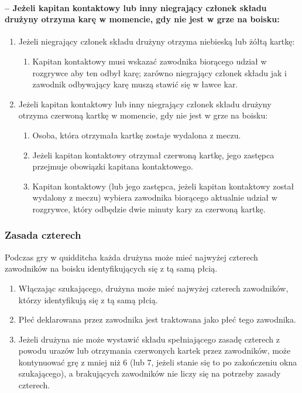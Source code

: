 \documentclass[12pt]{article}
\begin{document}
\paragraph{-- Jeżeli kapitan kontaktowy lub inny niegrający członek
	składu drużyny otrzyma karę w momencie, gdy nie jest w grze na boisku:}

\begin{enumerate}
	\item
	      Jeżeli niegrający członek składu drużyny otrzyma niebieską lub żółtą
	      kartkę:

	      \begin{enumerate}
		      \item
		            Kapitan kontaktowy musi wskazać zawodnika biorącego udział w
		            rozgrywce aby ten odbył karę; zarówno niegrający członek składu jak
		            i zawodnik odbywający karę muszą stawić się w ławce kar.
	      \end{enumerate}
	\item
	      Jeżeli kapitan kontaktowy lub inny niegrający członek składu drużyny
	      otrzyma czerwoną kartkę w momencie, gdy nie jest w grze na boisku:

	      \begin{enumerate}
		      \item
		            Osoba, która otrzymała kartkę zostaje wydalona z meczu.
		      \item
		            Jeżeli kapitan kontaktowy otrzymał czerwoną kartkę, jego zastępca
		            przejmuje obowiązki kapitana kontaktowego.
		      \item
		            Kapitan kontaktowy (lub jego zastępca, jeżeli kapitan kontaktowy
		            został wydalony z meczu) wybiera zawodnika biorącego aktualnie
		            udział w rozgrywce, który odbędzie dwie minuty kary za czerwoną
		            kartkę.
	      \end{enumerate}
\end{enumerate}

\subsubsection{Zasada czterech}

Podczas gry w quidditcha każda drużyna może mieć najwyżej czterech
zawodników na boisku identyfikujących się z tą samą płcią.

\begin{enumerate}
	\item
	      Włączając szukającego, drużyna może mieć najwyżej czterech zawodników,
	      którzy identyfikują się z tą samą płcią.
	\item
	      Płeć deklarowana przez zawodnika jest traktowana jako płeć tego
	      zawodnika.
	\item
	      Jeżeli drużyna nie może wystawić składu spełniającego zasadę czterech
	      z powodu urazów lub otrzymania czerwonych kartek przez zawodników,
	      może kontynuować grę z mniej niż 6 (lub 7, jeżeli stanie się to po
	      zakończeniu okna szukającego), a brakujących zawodników nie liczy się
	      na potrzeby zasady czterech.
\end{enumerate}
\end{document}
